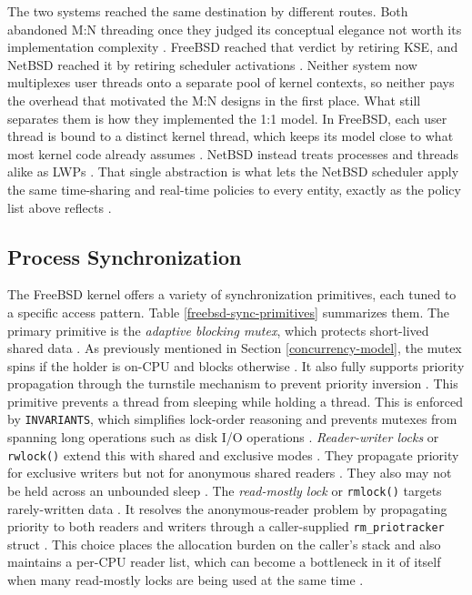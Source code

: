 The two systems reached the same destination by different routes. Both abandoned M:N threading once they judged its
conceptual elegance not worth its implementation complexity \parencite{freebsd_libthr}. FreeBSD reached that
verdict by retiring KSE, and NetBSD reached it by retiring scheduler activations \parencite{rasiukevicius2009}. Neither
system now multiplexes user threads onto a separate pool of kernel contexts, so neither pays the overhead that motivated
the M:N designs in the first place. What still separates them is how they implemented the 1:1 model. In FreeBSD,
each user thread is bound to a distinct kernel thread, which keeps its model close to what most kernel code already assumes
\parencite{mckusick2014_process}. NetBSD instead treats processes and threads alike as LWPs \parencite{rasiukevicius2009}. That
single abstraction is what lets the NetBSD scheduler apply the same time-sharing and real-time policies to every entity,
exactly as the policy list above reflects \parencite{rasiukevicius2009}.

\subsection{Process Synchronization} \label{process-synchronization} %

The FreeBSD kernel offers a variety of synchronization primitives, each tuned to a specific access pattern. Table
\ref{freebsd-sync-primitives} summarizes them. The primary primitive is the \textit{adaptive blocking mutex}, which
protects short-lived shared data \parencite{freebsd_locking}. As previously mentioned in Section \ref{concurrency-model},
the mutex spins if the holder is on-CPU and blocks otherwise \parencite{freebsd_locking}. It also fully supports
priority propagation through the turnstile mechanism to prevent priority inversion \parencite{freebsd_locking}.
This primitive prevents a thread from sleeping while holding a thread. This is enforced by \texttt{INVARIANTS},
which simplifies lock-order reasoning and prevents mutexes from spanning long operations such as disk I/O operations
\parencite{freebsd_locking}. \textit{Reader-writer locks} or \texttt{rwlock()} extend this with shared and exclusive
modes \parencite{freebsd_locking}. They propagate priority for exclusive writers but not for anonymous shared readers
\parencite{freebsd_locking}. They also may not be held across an unbounded sleep \parencite{freebsd_locking}. The
\textit{read-mostly lock} or \texttt{rmlock()} targets rarely-written data \parencite{freebsd_rmlock}. It resolves
the anonymous-reader problem by propagating priority to both readers and writers through a caller-supplied
\texttt{rm\_priotracker} struct \parencite{freebsd_rmlock}. This choice places the allocation burden on the caller's
stack and also maintains a per-CPU reader list, which can become a bottleneck in it of itself when many read-mostly
locks are being used at the same time \parencite{freebsd_rmlock}.

